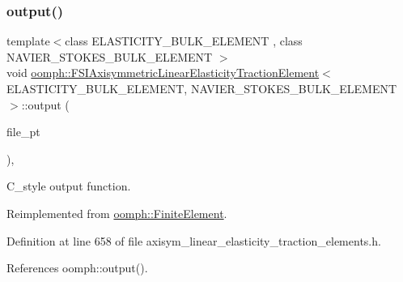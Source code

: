 \subsubsection{\texorpdfstring{output()}{output()}\hspace{0.1cm}{\footnotesize\ttfamily [3/4]}}
{\footnotesize\ttfamily template$<$class E\+L\+A\+S\+T\+I\+C\+I\+T\+Y\+\_\+\+B\+U\+L\+K\+\_\+\+E\+L\+E\+M\+E\+NT , class N\+A\+V\+I\+E\+R\+\_\+\+S\+T\+O\+K\+E\+S\+\_\+\+B\+U\+L\+K\+\_\+\+E\+L\+E\+M\+E\+NT $>$ \\
void \hyperlink{classoomph_1_1FSIAxisymmetricLinearElasticityTractionElement}{oomph\+::\+F\+S\+I\+Axisymmetric\+Linear\+Elasticity\+Traction\+Element}$<$ E\+L\+A\+S\+T\+I\+C\+I\+T\+Y\+\_\+\+B\+U\+L\+K\+\_\+\+E\+L\+E\+M\+E\+NT, N\+A\+V\+I\+E\+R\+\_\+\+S\+T\+O\+K\+E\+S\+\_\+\+B\+U\+L\+K\+\_\+\+E\+L\+E\+M\+E\+NT $>$\+::output (\begin{DoxyParamCaption}\item[{F\+I\+LE $\ast$}]{file\+\_\+pt }\end{DoxyParamCaption})\hspace{0.3cm}{\ttfamily [inline]}, {\ttfamily [virtual]}}



C\+\_\+style output function. 



Reimplemented from \hyperlink{classoomph_1_1FiniteElement_a72cddd09f8ddbee1a20a1ff404c6943e}{oomph\+::\+Finite\+Element}.



Definition at line 658 of file axisym\+\_\+linear\+\_\+elasticity\+\_\+traction\+\_\+elements.\+h.



References oomph\+::output().

\mbox{\label{classoomph_1_1FSIAxisymmetricLinearElasticityTractionElement_a980c9a362b13a8dc33002466c13d09c9}} 
